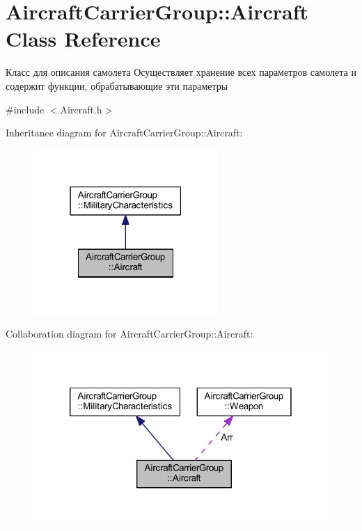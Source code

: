 \hypertarget{class_aircraft_carrier_group_1_1_aircraft}{}\section{Aircraft\+Carrier\+Group\+:\+:Aircraft Class Reference}
\label{class_aircraft_carrier_group_1_1_aircraft}


Класс для описания самолета  Осуществляет хранение всех параметров самолета и содержит функции, обрабатывающие эти параметры  




{\ttfamily \#include $<$Aircraft.\+h$>$}



Inheritance diagram for Aircraft\+Carrier\+Group\+:\+:Aircraft\+:
\nopagebreak
\begin{figure}[H]
\begin{center}
\leavevmode
\includegraphics[width=199pt]{class_aircraft_carrier_group_1_1_aircraft__inherit__graph}
\end{center}
\end{figure}


Collaboration diagram for Aircraft\+Carrier\+Group\+:\+:Aircraft\+:
\nopagebreak
\begin{figure}[H]
\begin{center}
\leavevmode
\includegraphics[width=320pt]{class_aircraft_carrier_group_1_1_aircraft__coll__graph}
\end{center}
\end{figure}
